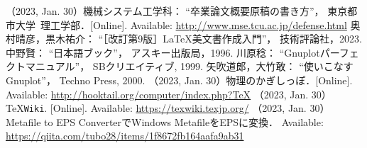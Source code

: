\documentclass[twocolumn]{jsarticle}
\begin{document}
{\small
\begin{thebibliography}{99}
  （2023, Jan. 30）機械システム工学科：
  ``卒業論文概要原稿の書き方''，
  東京都市大学~理工学部．[Online].
  Available: \url{http://www.mse.tcu.ac.jp/defense.html}
  奥村晴彦，黒木祐介：
  ``［改訂第9版］\LaTeX 美文書作成入門''，
  技術評論社，2023.
  中野賢：
  ``日本語\LaTeXe ブック''，
  アスキー出版局，1996.
  川原稔：
  ``Gnuplotパーフェクトマニュアル''，
  SBクリエイティブ, 1999.
  矢吹道郎，大竹敢：
  ``使いこなすGnuplot''，
  Techno Press, 2000.
  （2023, Jan. 30）物理のかぎしっぽ．[Online].
  Available: \url{http://hooktail.org/computer/index.php?TeX}
  （2023, Jan. 30）\TeX \texttt{Wiki}. [Online].
  Available: \url{https://texwiki.texjp.org/}
  （2023, Jan. 30）Metafile to EPS ConverterでWindows MetafileをEPSに変換．
  Available: \url{https://qiita.com/tubo28/items/1f8672fb164aafa9ab31}
\end{thebibliography}

\appendix
}
\end{document}
